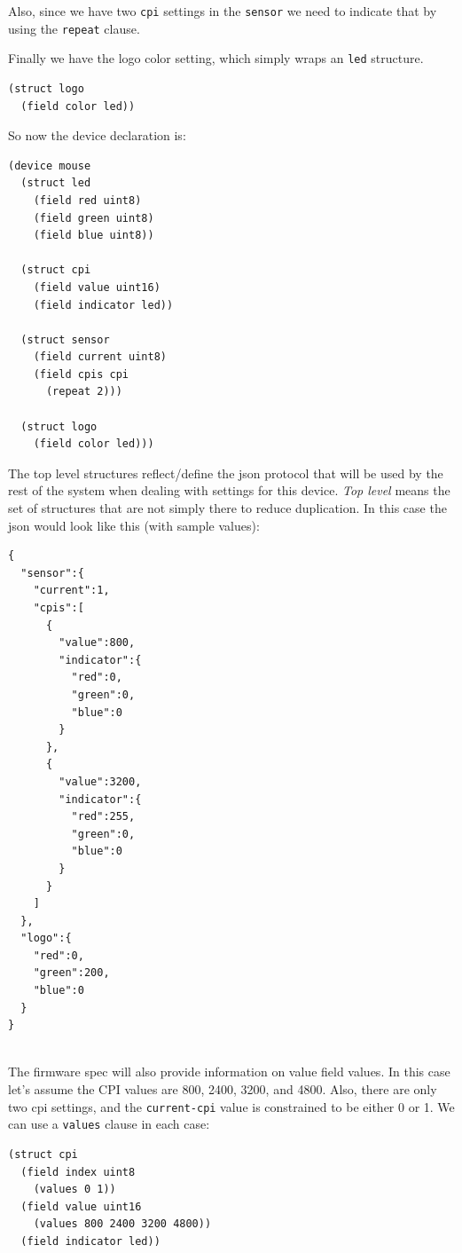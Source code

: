 \documentclass[12pt]{article}
\begin{document}
Also, since we have two \verb|cpi| settings in the \verb|sensor| we
need to indicate that by using the \verb|repeat| clause.

Finally we have the logo color setting, which simply wraps an
\verb|led| structure.

\begin{verbatim}
(struct logo
  (field color led))
\end{verbatim}

So now the device declaration is:

\begin{verbatim}
(device mouse
  (struct led
    (field red uint8)
    (field green uint8)
    (field blue uint8))

  (struct cpi
    (field value uint16)
    (field indicator led))

  (struct sensor
    (field current uint8)
    (field cpis cpi
      (repeat 2)))

  (struct logo
    (field color led)))
\end{verbatim}

The top level structures reflect/define the json protocol that will be used by
the rest of the system when dealing with settings for this device.
{\em Top level} means the set of structures that are not simply there
to reduce duplication. In this case the json would look like this
(with sample values):

\begin{verbatim}
{
  "sensor":{
    "current":1,
    "cpis":[
      {
        "value":800,
        "indicator":{
          "red":0,
          "green":0,
          "blue":0
        }
      },
      {
        "value":3200,
        "indicator":{
          "red":255,
          "green":0,
          "blue":0
        }
      }
    ]
  },
  "logo":{
    "red":0,
    "green":200,
    "blue":0
  }
}
 
\end{verbatim}

The firmware spec will also provide information on value field values.
In this case let's assume the CPI values are 800, 2400, 3200, and
4800. Also, there are only two cpi settings, and the \verb|current-cpi| value is
constrained to be either 0 or 1.  We can use a \verb|values| clause
in each case:

\begin{verbatim}
(struct cpi
  (field index uint8
    (values 0 1))
  (field value uint16
    (values 800 2400 3200 4800))
  (field indicator led))
\end{verbatim}
\end{document}

